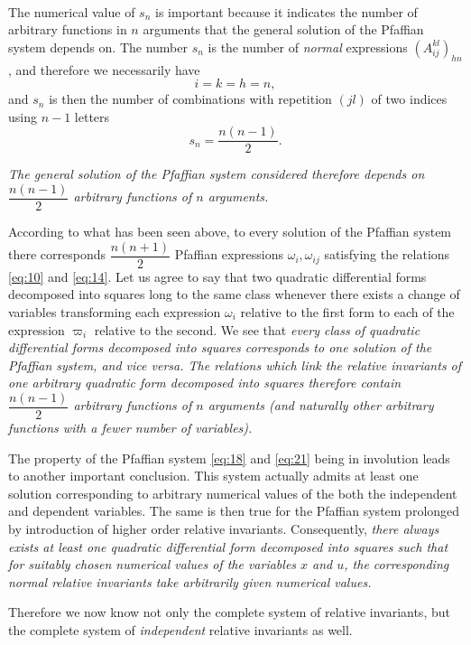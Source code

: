 \documentclass[leqno,12pt]{article}
\theoremstyle{shape1}
\theoremstyle{shape0}
\theoremstyle{shape2}
\theoremstyle{definition}
\begin{document}
\paragraph{}
\label{sec:18}
The numerical value of $s_{n}$ is important because it indicates the number of arbitrary functions in $n$ arguments that the general solution of the Pfaffian system depends on. The number $s_{n}$ is the number of \emph{normal} expressions $(A^{kl}_{ij})_{hn}$, and therefore we necessarily have
\[
i=k=h=n,
\]
and $s_{n}$ is then the number of combinations with repetition $(jl)$ of two indices using $n-1$ letters
\[
s_{n}=\frac{n(n-1)}{2}.
\]

\emph{The general solution of the Pfaffian system considered therefore depends on $\dfrac{n(n-1)}{2}$ arbitrary functions of $n$ arguments.}

According to what has been seen above, to every solution of the Pfaffian system there corresponds $\dfrac{n(n+1)}{2}$ Pfaffian expressions $\omega_{i},\omega_{ij}$ satisfying the relations \eqref{eq:10} and \eqref{eq:14}. Let us agree to say that two quadratic differential forms decomposed into squares long to the same class whenever there exists a change of variables transforming each expression $\omega_{i}$ relative to the first form to each of the expression $\varpi_{i}$ relative to the second. We see that \emph{every class of quadratic differential forms decomposed into squares corresponds to one solution of the Pfaffian system, and vice versa. The relations which link the relative invariants of one arbitrary quadratic form decomposed into squares therefore contain $\dfrac{n(n-1)}{2}$ arbitrary functions of $n$ arguments (and naturally other arbitrary functions with a fewer number of variables).}

The property of the Pfaffian system \eqref{eq:18} and \eqref{eq:21} being in involution leads to another important conclusion. This system actually admits at least one solution corresponding to arbitrary numerical values of the both the independent and dependent variables. The same is then true for the Pfaffian system prolonged by introduction of higher order relative invariants. Consequently, \emph{there always exists at least one quadratic differential form decomposed into squares such that for suitably chosen numerical values of the variables $x$ and $u$, the corresponding normal relative invariants take arbitrarily given numerical values.}

Therefore we now know not only the complete system of relative invariants, but the complete system of \emph{independent} relative invariants as well.
\end{document}

